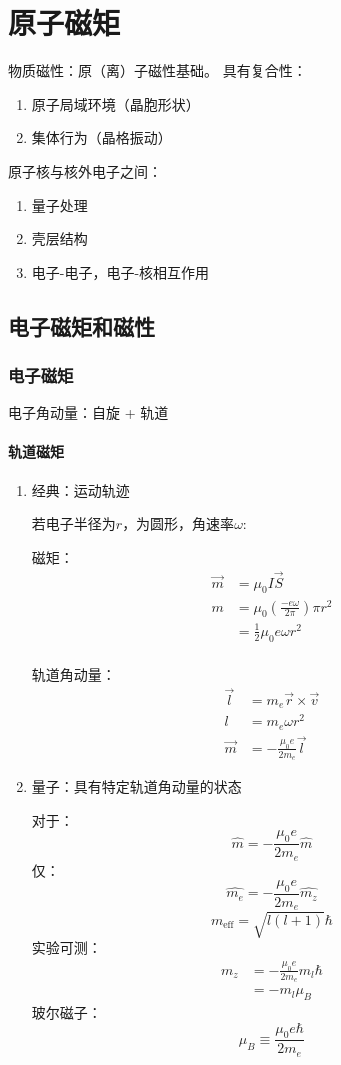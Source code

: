 \chapter{原子磁矩}
物质磁性：原（离）子磁性基础。
具有复合性：
\begin{enumerate}
    \item 原子局域环境（晶胞形状） 
    \item 集体行为（晶格振动） 
\end{enumerate}


原子核与核外电子之间：
\begin{enumerate}
    \item 量子处理
    \item 壳层结构
    \item 电子-电子，电子-核相互作用
\end{enumerate}
\section{电子磁矩和磁性}



\subsection{电子磁矩}
电子角动量：自旋 + 轨道
\subsubsection{轨道磁矩}
\begin{enumerate}
\item 经典：运动轨迹

若电子半径为$r$，为圆形，角速率$\omega$:

磁矩：
\begin{align*}
    \vec{m} &= \mu_0 I \vec{S}\\
    m &= \mu_0 (\frac{-e\omega}{2\pi})\pi r^2\\
    &= \frac{1}{2} \mu_0 e \omega r^2\\
\end{align*}

轨道角动量：
\begin{align*}
    \vec{l} &= m_e \vec{r} \times \vec{v}\\
    l &= m_e \omega r^2\\
    \vec{m} &= -\frac{\mu_0 e}{2m_e}\vec{l}
\end{align*}
\item 量子：具有特定轨道角动量的状态

对于：
\[ \hat{m} = -\frac{\mu_0 e}{2 m_e}\hat{m} \]
仅：
\[ \hat{m_e} = -\frac{\mu_0 e}{2 m_e}\hat{m_z} \]
\[ m_{\text{eff}} = \sqrt{l(l+1)}\hbar \]
实验可测：
\begin{align*}
    m_z &= -\frac{\mu_0 e}{2m_e}m_l \hbar\\
    &= -m_l\mu_B
\end{align*}
玻尔磁子：
\[\mu_B \equiv \frac{\mu_0 e \hbar}{2m_e}\]
\end{enumerate}
